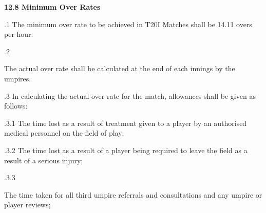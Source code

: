 \documentclass[12pt]{article}
\begin{document}
\vspace{\baselineskip}
{\fontsize{11pt}{13.2pt}\selectfont \textbf{12.8 \tabto{0.47in} Minimum Over Rates}\par}\par


\vspace{\baselineskip}
{\fontsize{9pt}{10.8pt}.1 \tabto{0.49in} The minimum over rate to be achieved in T20I Matches shall be 14.11 overs per hour.\par}\par


\vspace{\baselineskip}
{\fontsize{9pt}{10.8pt}.2 \tabto{0.49in} {\fontsize{8pt}{9.6pt}\selectfont The actual over rate shall be calculated at the end of each innings by the umpires.\par}\par}\par


\vspace{\baselineskip}
{\fontsize{9pt}{10.8pt}.3 \tabto{0.49in} In calculating the actual over rate for the match, allowances shall be given as follows:\par}\par


\vspace{\baselineskip}
\begin{adjustwidth}{1.18in}{0.15in}
{\fontsize{9pt}{10.8pt}.3.1 \tabto{1.17in} The time lost as a result of treatment given to a player by an authorised medical personnel on the field of play;\par}\par

\end{adjustwidth}


\vspace{\baselineskip}
\begin{adjustwidth}{1.18in}{0.31in}
{\fontsize{9pt}{10.8pt}.3.2 \tabto{1.17in} The time lost as a result of a player being required to leave the field as a result of a serious injury;\par}\par

\end{adjustwidth}


\vspace{\baselineskip}
\begin{adjustwidth}{0.49in}{0.0in}
{\fontsize{9pt}{10.8pt}.3.3 \tabto{1.17in} {\fontsize{8pt}{9.6pt}\selectfont The time taken for all third umpire referrals and consultations and any umpire or player reviews;\par}\par}\par

\end{adjustwidth}
\end{document}
